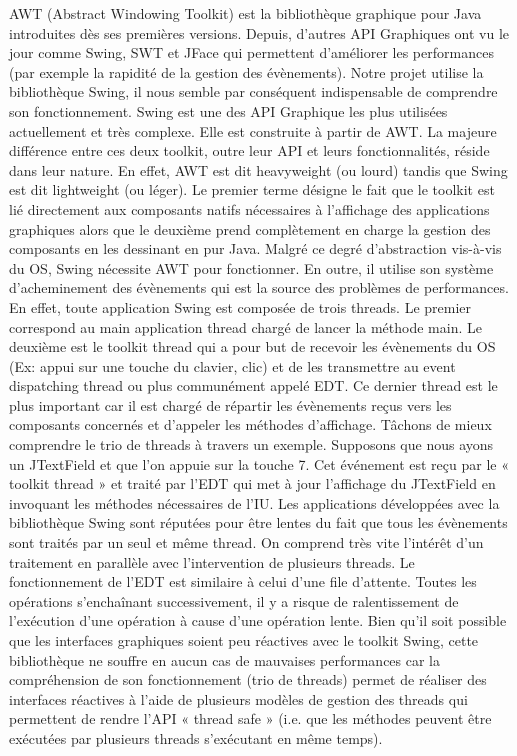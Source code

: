 AWT (Abstract Windowing Toolkit) est la bibliothèque graphique pour Java introduites dès ses premières versions. Depuis, d’autres API Graphiques ont vu le jour comme Swing, SWT et JFace qui permettent d’améliorer les performances (par exemple la rapidité de la gestion des évènements). Notre projet utilise la bibliothèque Swing, il nous semble par conséquent indispensable de comprendre son fonctionnement.
Swing est une des API Graphique les plus utilisées actuellement et très complexe. Elle est construite à partir de AWT. La majeure différence entre ces deux toolkit, outre leur API et leurs fonctionnalités, réside dans leur nature. En effet, AWT est dit heavyweight (ou lourd) tandis que Swing est dit lightweight (ou léger). Le premier terme désigne le fait que le toolkit est lié directement aux composants natifs nécessaires à l’affichage des applications graphiques alors que le deuxième prend complètement en charge la gestion des composants en les dessinant en pur Java.
Malgré ce degré d’abstraction vis-à-vis du OS, Swing nécessite AWT pour fonctionner. En outre, il utilise son système d’acheminement des évènements qui est la source des problèmes de performances. En effet, toute application Swing est composée de trois threads.
Le premier correspond au main application thread chargé de lancer la méthode main. Le deuxième est le toolkit thread qui a pour but de recevoir les évènements du OS (Ex: appui sur une touche du clavier, clic) et de les transmettre au event dispatching thread ou plus communément appelé EDT. Ce dernier thread est le plus important car il est chargé de répartir les évènements reçus vers les composants concernés et d’appeler les méthodes d’affichage.
Tâchons de mieux comprendre le trio de threads à travers un exemple. Supposons que nous ayons un JTextField et que l’on appuie sur la touche 7. Cet événement est reçu par le « toolkit thread » et traité par l’EDT qui met à jour l’affichage du JTextField en invoquant les méthodes nécessaires de l’IU.
Les applications développées avec la bibliothèque Swing sont réputées pour être lentes du fait que tous les évènements sont traités par un seul et même thread. On comprend très vite l’intérêt d’un traitement en parallèle avec l’intervention de plusieurs threads. Le fonctionnement de l’EDT est similaire à celui d’une file d’attente. Toutes les opérations s’enchaînant successivement, il y a risque de ralentissement de l’exécution d’une opération à cause d’une opération lente. Bien qu’il soit possible que les interfaces graphiques soient peu réactives avec le toolkit Swing, cette bibliothèque ne souffre en aucun cas de mauvaises performances car la compréhension de son fonctionnement (trio de threads) permet de réaliser des interfaces réactives à l’aide de plusieurs modèles de gestion des threads qui permettent de rendre l’API « thread safe » (i.e. que les méthodes peuvent être exécutées par plusieurs threads s’exécutant en même temps).

